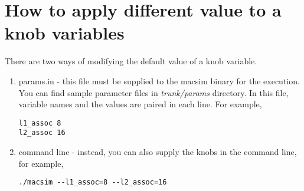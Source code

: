 \section{How to apply different value to a knob variables}

There are two ways of modifying the default value of a knob variable.

\begin{enumerate}
  \item params.in - this file must be supplied to the macsim binary
  for the execution. You can find sample parameter files
  in \textit{trunk/params} directory. In this file, variable names and
  the values are paired in each line. For example,

\begin{Verbatim}
l1_assoc 8
l2_assoc 16
\end{Verbatim}


  \item command line - instead, you can also supply the knobs in the command line, for example,

\begin{Verbatim}
./macsim --l1_assoc=8 --l2_assoc=16
\end{Verbatim}

\end{enumerate}


